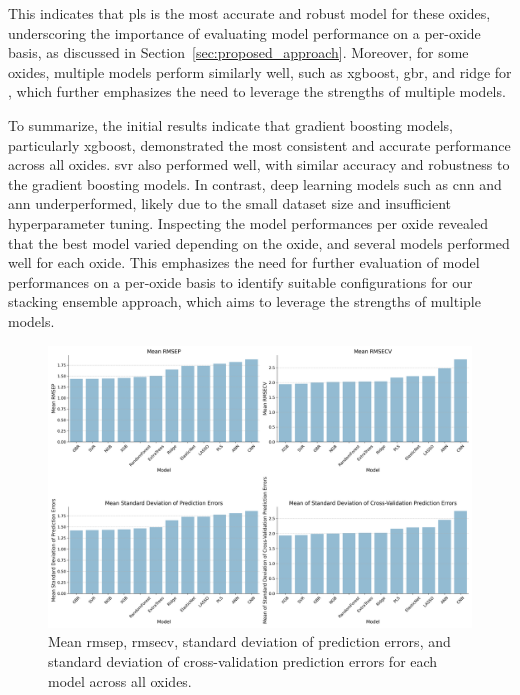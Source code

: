 This indicates that \gls{pls} is the most accurate and robust model for these oxides, underscoring the importance of evaluating model performance on a per-oxide basis, as discussed in Section~\ref{sec:proposed_approach}.
Moreover, for some oxides, multiple models perform similarly well, such as \gls{xgboost}, \gls{gbr}, and ridge for , which further emphasizes the need to leverage the strengths of multiple models.

To summarize, the initial results indicate that gradient boosting models, particularly \gls{xgboost}, demonstrated the most consistent and accurate performance across all oxides.
\gls{svr} also performed well, with similar accuracy and robustness to the gradient boosting models.
In contrast, deep learning models such as \gls{cnn} and \gls{ann} underperformed, likely due to the small dataset size and insufficient hyperparameter tuning.
Inspecting the model performances per oxide revealed that the best model varied depending on the oxide, and several models performed well for each oxide.
This emphasizes the need for further evaluation of model performances on a per-oxide basis to identify suitable configurations for our stacking ensemble approach, which aims to leverage the strengths of multiple models.

\begin{figure}[h]
    \centering
    \includegraphics[width=\textwidth]{images/init_results_means.png}
    \caption{Mean \gls{rmsep}, \gls{rmsecv}, standard deviation of prediction errors, and standard deviation of cross-validation prediction errors for each model across all oxides.}
    \label{fig:init_results_rmses}
\end{figure}

